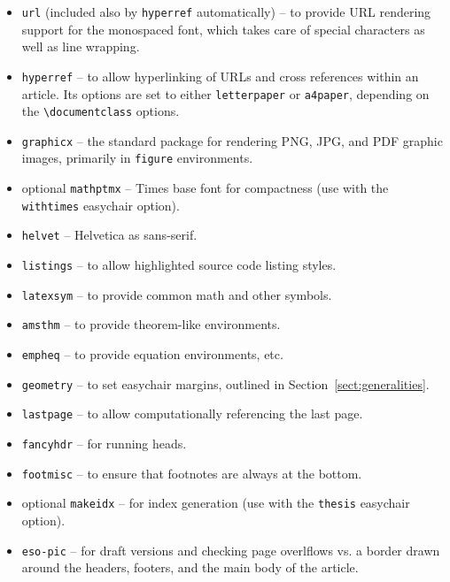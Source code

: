 \documentclass{imav2013}
\newcommand{\easychair}{\textsf{easychair}}
\begin{document}
\begin{itemize}
\item
\texttt{url} \cite{url-package} (included also by \texttt{hyperref} automatically) -- to provide URL rendering support for the
monospaced font, which takes care of special characters as well as line 
wrapping.

\item
\texttt{hyperref} \cite{hyperref-package} -- to allow hyperlinking of URLs and
cross references within an article.
Its options are set to either \verb+letterpaper+ or \verb+a4paper+, depending
on the \verb+\documentclass+ options.

\item
\texttt{graphicx} \cite{graphicx-package} -- the standard package for rendering
PNG, JPG, and PDF graphic images, primarily in \texttt{figure} environments.

\item
optional \texttt{mathptmx} \cite{mathptmx-package} -- Times base font for compactness
(use with the \texttt{withtimes} {\easychair} option).

\item
\texttt{helvet} \cite{helvet-package} -- Helvetica as {\sf sans-serif}.

\item
\texttt{listings} \cite{listings-package} -- to allow highlighted source code 
listing styles.

\item
\texttt{latexsym} \cite{latexsym-package} -- to provide common math and other 
symbols.

\item
\texttt{amsthm} \cite{amsthm-package} -- to provide {\AmS} theorem-like 
environments.

\item
\texttt{empheq} \cite{empheq-package} -- to provide equation environments, etc.

\item
\texttt{geometry} \cite{geometry-package} -- to set {\easychair} margins, 
outlined in Section~\ref{sect:generalities}.

\item
\texttt{lastpage} \cite{lastpage-package} -- to allow computationally
referencing the last page.

\item
\texttt{fancyhdr} \cite{fancyhdr-package} -- for running heads.

\item
\texttt{footmisc} \cite{footmisc-package} -- to ensure that footnotes are
always at the bottom.

\item
optional \texttt{makeidx} \cite{makeidx-package} -- for index generation
(use with the \texttt{thesis} {\easychair} option).

\item
\texttt{eso-pic} \cite{eso-pic-package} -- for draft versions and checking page
overlflows vs. a border drawn around the headers, footers, and the main body of
the article.

\end{itemize}
\end{document}
